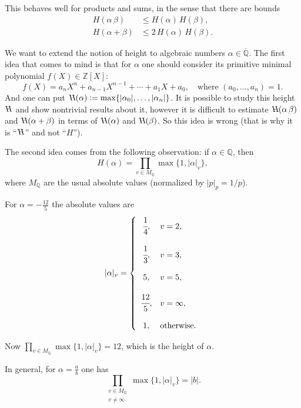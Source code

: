 \documentclass{article}
\newcommand{\dfn}{\mathrel{\mathop:}=}
\newcommand{\ZZ}{\mathbb{Z}}
\newcommand{\QQ}{\mathbb{Q}}
\newcommand{\badH}{\mathrel{\reflectbox{\rotatebox[origin=c]{180}{$H$}}}}
\newcommand{\examplesymbol}{$\blacktriangle$}
\renewcommand{\qedsymbol}{$\blacksquare$}
\theoremstyle{myplain}
\theoremstyle{mydefinition}
\newenvironment{example}
  {\pushQED{\qed}\renewcommand{\qedsymbol}{\examplesymbol}\examplex}
  {\popQED\endexamplex}
\begin{document}
This behaves well for products and sums, in the sense that there are bounds
\begin{align*}
  H (\alpha\,\beta) & \le H (\alpha) \, H (\beta),\\
  H (\alpha + \beta) & \le 2 \, H (\alpha) \, H (\beta).
\end{align*}

We want to extend the notion of height to algebraic numbers
$\alpha \in \overline{\QQ}$. The first idea that comes to mind is that for
$\alpha$ one should consider its primitive minimal polynomial
$f (X) \in \ZZ [X]$:
$$f (X) = a_n X^n + a_{n-1} X^{n-1} + \cdots + a_1 X + a_0, \quad \text{where } (a_0, \ldots, a_n) = 1.$$
And one can put
$\badH\!\! (\alpha) \dfn \max \{ |\alpha_0|, \ldots, |\alpha_n| \}$. It is
possible to study this height $\badH$ and show nontrivial results about it,
however it is difficult to estimate $\badH\!\! (\alpha\,\beta)$ and
$\badH\!\! (\alpha + \beta)$ in terms of $\badH\!\! (\alpha)$ and
$\badH\!\! (\beta)$. So this idea is wrong (that is why it is ``$\badH$'' and
not ``$H$'').

\vspace{1em}

The second idea comes from the following observation: if $\alpha \in \QQ$, then
$$H (\alpha) = \prod_{v\in M_\QQ} \max \{ 1, |\alpha|_v \},$$
where $M_\QQ$ are the usual absolute values (normalized by $|p|_p = 1/p$).

\begin{example}
  For $\alpha = -\frac{12}{5}$ the absolute values are
  \[ |\alpha|_v =
    \left\{\begin{array}{cl}
             \cfrac{1}{4}, & v = 2,\\
             \\
             \cfrac{1}{3}, & v = 3,\\
             \\
             5, & v = 5, \\
             \\
             \cfrac{12}{5}, & v = \infty, \\
             \\
             1, & \text{otherwise}.
           \end{array}\right. \]

  Now $\prod_{v\in M_\QQ} \max \{ 1, |\alpha|_v \} = 12$, which is the height of
  $\alpha$.
\end{example}

In general, for $\alpha = \frac{a}{b}$ one has
$$\prod_{\substack{ v\in M_\QQ \\ v \ne \infty }} \max \{ 1, |\alpha|_v \} = |b|.$$
\end{document}
